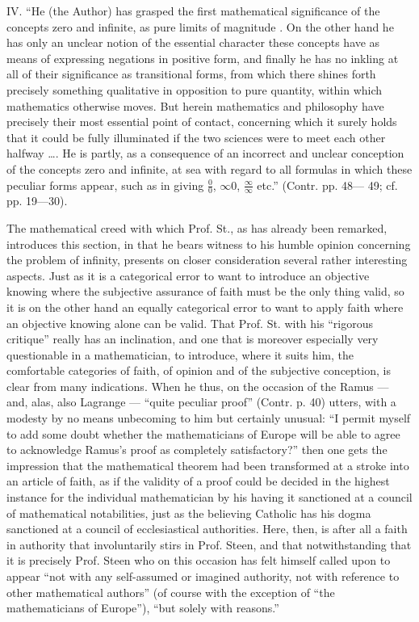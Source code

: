 \documentclass[12pt,a4paper,openany]{book}
\newcommand{\opage}[1]{\marginnote{\footnotesize\textit{[#1]}}}
\begin{document}
IV. ``He (the Author) has grasped the first mathematical
significance of the concepts zero and infinite, as pure limits of magnitude
. On the other hand he has only an unclear notion
of the essential character these concepts have as
means of expressing negations in positive form, and finally he has no inkling at all of their significance as
\opage{36}\setcounter{footnote}{0}%
transitional forms, from which there shines forth precisely something qualitative
in opposition to pure quantity, within which mathematics otherwise moves. But herein mathematics and philosophy have precisely their most essential point of contact,
concerning which it surely holds that it could be fully illuminated
if the two sciences were to meet each other halfway \dots{}. He
is partly, as a consequence of an incorrect and unclear conception
of the concepts zero and infinite, at sea with regard to
all formulas in which these peculiar forms appear,
such as in giving $\frac{0}{0}$, $\infty 0$, $\frac{\infty}{\infty}$ etc.'' (Contr. pp. 48---
49; cf. pp. 19---30).

The mathematical creed with which Prof.
St., as has already been remarked, introduces this section,
in that he bears witness to his humble opinion
concerning the problem of infinity, presents on closer
consideration several rather interesting aspects. Just as it
is a categorical error to want to introduce an objective
knowing where the subjective assurance of faith must be the
only thing valid, so it is on the other hand an equally
categorical error to want to apply faith where an
objective knowing alone can be valid. That Prof. St.
with his ``rigorous critique'' really has an inclination, and one that is moreover
especially very questionable in a mathematician, to introduce, where
it suits him, the comfortable categories of faith, of opinion and of the
subjective conception, is clear from many indications. When he thus, on the occasion of the Ramus --- and, alas,
also Lagrange --- ``quite peculiar proof'' (Contr. p. 40)
utters, with a modesty by no means unbecoming to him but certainly unusual:
``I permit myself to add some doubt whether
the mathematicians of Europe will be able to agree to acknowledge
Ramus's proof as completely satisfactory?'' then one gets
the impression that the mathematical theorem had been
transformed at a stroke into an article of faith, as if the validity
of a proof could be decided in the highest instance for the individual
\opage{37}\setcounter{footnote}{0}%
mathematician by his having it sanctioned at a council of mathematical notabilities, just as the believing
Catholic has his dogma sanctioned at a council of
ecclesiastical authorities. Here, then, is after all a faith in authority
that involuntarily stirs in Prof. Steen, and that notwithstanding that it is precisely Prof. Steen who on this occasion has felt himself called upon to appear ``not with any
self-assumed or imagined authority, not with reference to
other mathematical authors'' (of course with the exception
of ``the mathematicians of Europe''), ``but solely with
reasons.''
\end{document}
